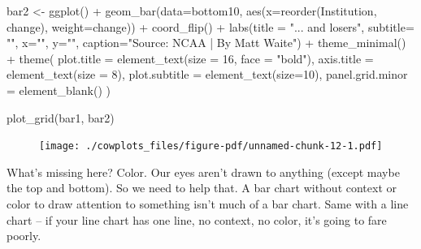 \documentclass[
  letterpaper,
  DIV=11,
  numbers=noendperiod]{scrreprt}
\newenvironment{Shaded}{\begin{snugshade}}{\end{snugshade}}
\newcommand{\AttributeTok}[1]{\textcolor[rgb]{0.40,0.45,0.13}{#1}}
\newcommand{\DecValTok}[1]{\textcolor[rgb]{0.68,0.00,0.00}{#1}}
\newcommand{\FunctionTok}[1]{\textcolor[rgb]{0.28,0.35,0.67}{#1}}
\newcommand{\NormalTok}[1]{\textcolor[rgb]{0.00,0.23,0.31}{#1}}
\newcommand{\OtherTok}[1]{\textcolor[rgb]{0.00,0.23,0.31}{#1}}
\newcommand{\SpecialCharTok}[1]{\textcolor[rgb]{0.37,0.37,0.37}{#1}}
\newcommand{\StringTok}[1]{\textcolor[rgb]{0.13,0.47,0.30}{#1}}
\begin{document}
\begin{Shaded}
\begin{Highlighting}[]
\NormalTok{bar2 }\OtherTok{\textless{}{-}} \FunctionTok{ggplot}\NormalTok{() }\SpecialCharTok{+} 
  \FunctionTok{geom\_bar}\NormalTok{(}\AttributeTok{data=}\NormalTok{bottom10, }\FunctionTok{aes}\NormalTok{(}\AttributeTok{x=}\FunctionTok{reorder}\NormalTok{(Institution, change), }\AttributeTok{weight=}\NormalTok{change)) }\SpecialCharTok{+}
  \FunctionTok{coord\_flip}\NormalTok{() }\SpecialCharTok{+}  
  \FunctionTok{labs}\NormalTok{(}\AttributeTok{title =} \StringTok{"... and losers"}\NormalTok{, }\AttributeTok{subtitle=} \StringTok{""}\NormalTok{, }\AttributeTok{x=}\StringTok{""}\NormalTok{, }\AttributeTok{y=}\StringTok{""}\NormalTok{,  }\AttributeTok{caption=}\StringTok{"Source: NCAA | By Matt Waite"}\NormalTok{) }\SpecialCharTok{+} 
  \FunctionTok{theme\_minimal}\NormalTok{() }\SpecialCharTok{+} 
  \FunctionTok{theme}\NormalTok{(}
    \AttributeTok{plot.title =} \FunctionTok{element\_text}\NormalTok{(}\AttributeTok{size =} \DecValTok{16}\NormalTok{, }\AttributeTok{face =} \StringTok{"bold"}\NormalTok{),}
    \AttributeTok{axis.title =} \FunctionTok{element\_text}\NormalTok{(}\AttributeTok{size =} \DecValTok{8}\NormalTok{), }
    \AttributeTok{plot.subtitle =} \FunctionTok{element\_text}\NormalTok{(}\AttributeTok{size=}\DecValTok{10}\NormalTok{), }
    \AttributeTok{panel.grid.minor =} \FunctionTok{element\_blank}\NormalTok{()}
\NormalTok{    )}
\end{Highlighting}
\end{Shaded}

\begin{Shaded}
\begin{Highlighting}[]
\FunctionTok{plot\_grid}\NormalTok{(bar1, bar2) }
\end{Highlighting}
\end{Shaded}

\begin{figure}[H]

{\centering \texttt{[image: ./cowplots\_files/figure-pdf/unnamed-chunk-12-1.pdf]}

}

\end{figure}

What's missing here? Color. Our eyes aren't drawn to anything (except
maybe the top and bottom). So we need to help that. A bar chart without
context or color to draw attention to something isn't much of a bar
chart. Same with a line chart -- if your line chart has one line, no
context, no color, it's going to fare poorly.
\end{document}
